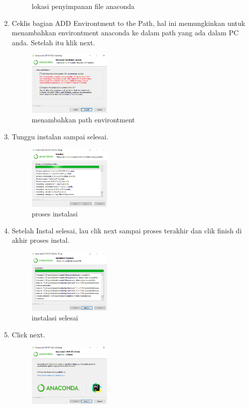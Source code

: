 \begin{enumerate}
\begin{figure}[h]
			\centering
			\caption{lokasi penyimpanan file anaconda}
			\end{figure}
		\item Ceklis bagian ADD Environtment to the Path, hal ini memungkinkan untuk menambahkan environtment anaconda ke dalam path yang ada dalam PC anda. Setelah itu klik next.
			\begin{figure}[h]
			\includegraphics[width=4cm]{figure/5.png}
			\centering
			\caption{menambahkan path environtment}
			\end{figure}
		\item Tunggu instalan sampai selesai.
			\begin{figure}[h]
			\includegraphics[width=4cm]{figure/7.png}
			\centering
			\caption{proses instalasi}
			\end{figure}
		\item Setelah Instal selesai, lau clik next sampai proses terakhir dan clik finish di akhir proses instal.
			\begin{figure}[h]
			\includegraphics[width=4cm]{figure/8.png}
			\centering
			\caption{instalasi selesai}
			\end{figure}
		\item Click next.	
			\begin{figure}[h]
			\includegraphics[width=4cm]{figure/9.png}

\end{figure}
\end{enumerate}
